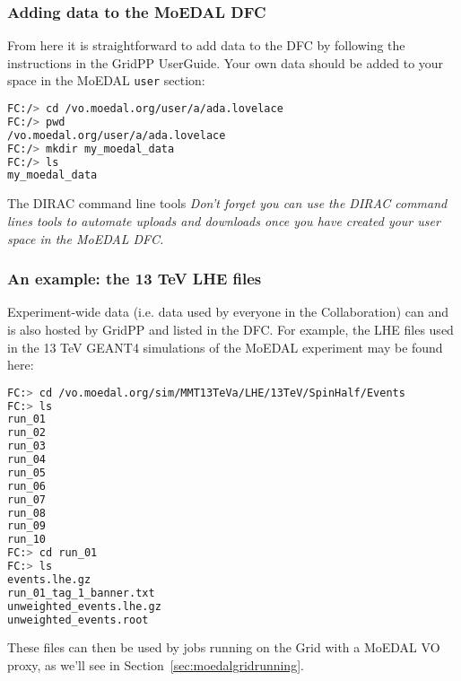 \subsubsection{Adding data to the MoEDAL DFC}
\label{sec:addingdata}
From here it is straightforward to add data to the \ac{DFC} by
following the instructions in the GridPP UserGuide.
Your own data should be added to your space in the MoEDAL \texttt{user}
section:
\begin{lstlisting}[gobble=0,numbers=none,language=bash]
FC:/> cd /vo.moedal.org/user/a/ada.lovelace
FC:/> pwd
/vo.moedal.org/user/a/ada.lovelace
FC:/> mkdir my_moedal_data
FC:/> ls
my_moedal_data
\end{lstlisting}

\begin{hintbox}{The DIRAC command line tools}
\emph{Don't forget you can use the DIRAC command lines tools to
automate uploads and downloads once you have created your
user space in the MoEDAL \ac{DFC}.}
\end{hintbox}

\clearpage

\subsubsection{An example: the 13 TeV LHE files}
\label{sec:lhedataexample}
Experiment-wide data (i.e. data used by everyone in the Collaboration)
can and is also hosted by GridPP and listed in the \ac{DFC}.
For example, the \ac{LHE} files used in the 13 TeV GEANT4 simulations
of the \ac{MoEDAL} experiment may be found here:

\begin{lstlisting}[gobble=0,numbers=none,language=bash]
FC:> cd /vo.moedal.org/sim/MMT13TeVa/LHE/13TeV/SpinHalf/Events
FC:> ls
run_01
run_02
run_03
run_04
run_05
run_06
run_07
run_08
run_09
run_10
FC:> cd run_01
FC:> ls
events.lhe.gz
run_01_tag_1_banner.txt
unweighted_events.lhe.gz
unweighted_events.root
\end{lstlisting}

These files can then be used by jobs running on the Grid
with a \ac{MoEDAL} \ac{VO} proxy,
as we'll see in Section~\ref{sec:moedalgridrunning}.
